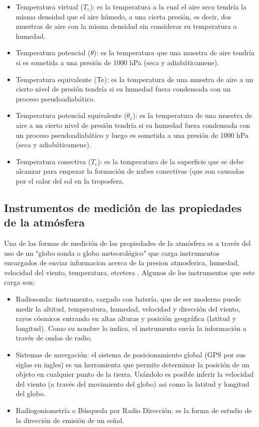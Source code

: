 \documentclass[12pt,letterpaper]{article}
\begin{document}
\begin{itemize}
\item Temperatura virtual ($T_{v}$): es la temperatura a la cual el aire seco tendría la misma densidad que el aire húmedo, a una cierta presión, es decir, dos muestras de aire con la misma densidad sin considerar su temperatura o humedad\cite{f}.
\item Temperatura potencial ($\theta$): es la temperatura que una muestra de aire tendría si es sometida a una presión de 1000 hPa (seca y adiabáticamene)\cite{f}.
\item Temperatura equivalente (Te): es la temperatura de una muestra de aire a un cierto nivel de presión tendría si su humedad fuera condensada con un proceso pseudoadiabático\cite{f}.
\item Temperatura potencial equivalente ($\theta_{e}$): es la temperatura de una muestra de aire a un cierto nivel de presión tendría si su humedad fuera condensada con un proceso pseudoadiabático y luego es sometida a una presión de 1000 hPa (seca y adiabáticamene)\cite{f}.
\item Temperatura conectiva ($T_{c}$): es la temperatura de la superficie que se debe alcanzar para empezar la formación de nubes conectivas (que son causadas por el calor del sol en la troposfera\cite{f}.

\end{itemize}



\subsection{Instrumentos de medición de las propiedades de la atmósfera}

Una de las formas de medición de las propiedades de la atmósfera es a través del uso de un "globo sonda o globo meteorológico" que carga instrumentos encargados de enviar informacion acerca de la presion atmosferica, humedad, velocidad del viento, temperatura, etcetera \cite{b}. Algunos de los instrumentos que este carga son:\\

\begin{itemize}
\item Radiosonda: instrumento, cargado con batería, que de ser moderno puede medir la altitud, temperatura, humedad, velocidad y dirección del viento, rayos cósmicos entrando en altas alturas y posición geográfica (latitud y longitud)\cite{c}. Como su nombre lo indica, el instrumento envía la información a través de ondas de radio.
\item Sistemas de navegación: el sistema de posicionamiento global (GPS por sus siglas en ingles) es un herramienta que permite determinar la posición de un objeto en cualquier punto de la tierra\cite{d}. Usándolo es posible inferir la velocidad del viento (a través del movimiento del globo) asi como la latitud y longitud del globo.
\item Radiogoniometría o Búsqueda por Radio Dirección: es la forma de estudio de la dirección de emisión de un señal\cite{e}. 
\end{itemize}
\end{document}
